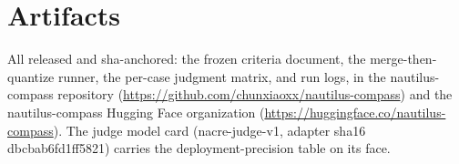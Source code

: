 \documentclass[11pt]{article}
\begin{document}
\section{Artifacts}
All released and sha-anchored: the frozen criteria document, the
merge-then-quantize runner, the per-case judgment matrix, and run logs, in the
nautilus-compass repository (\url{https://github.com/chunxiaoxx/nautilus-compass})
and the nautilus-compass Hugging Face organization
(\url{https://huggingface.co/nautilus-compass}). The judge model card
(nacre-judge-v1, adapter sha16 dbcbab6fd1ff5821) carries the
deployment-precision table on its face.
\end{document}
